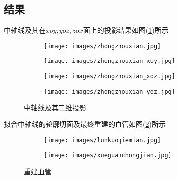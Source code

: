     \subsection{结果}
        \par
        中轴线及其在$xoy,yoz,zox$面上的投影结果如图(\ref{中轴线及其二维投影})所示
           \begin{figure}[H]
                \centering
                \begin{subfigure}[b]{0.4\textwidth}
                    \texttt{[image: images/zhongzhouxian.jpg]}
                \end{subfigure}
                \begin{subfigure}[b]{0.4\textwidth}
                    \texttt{[image: images/zhongzhouxian\_xoy.jpg]}
                \end{subfigure}
                \begin{subfigure}[b]{0.4\textwidth}
                    \texttt{[image: images/zhongzhouxian\_xoz.jpg]}
                \end{subfigure}
                \begin{subfigure}[b]{0.4\textwidth}
                    \texttt{[image: images/zhongzhouxian\_yoz.jpg]}
                \end{subfigure}
                \caption{中轴线及其二维投影}
                \label{中轴线及其二维投影}
            \end{figure}
            拟合中轴线的轮廓切面及最终重建的血管如图(\ref{重建血管})所示
           \begin{figure}[H]
                \centering
                \begin{subfigure}[b]{0.4\textwidth}
                    \texttt{[image: images/lunkuoqiemian.jpg]}
                \end{subfigure}
                \begin{subfigure}[b]{0.4\textwidth}
                    \texttt{[image: images/xueguanchongjian.jpg]}
                \end{subfigure}
                \caption{重建血管}
                \label{重建血管}
            \end{figure}

